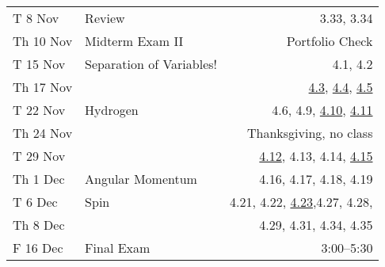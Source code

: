 \documentclass{article}
\begin{document}
\begin{minipage}{\textwidth}
\begin{tabular}{llr}
T 8 Nov & Review & 3.33, 3.34\\
Th 10 Nov &Midterm Exam II & Portfolio Check\\

T 15 Nov & Separation of Variables! &4.1, 4.2 \\
Th 17 Nov & & {\underline{4.3}}, {\underline{4.4}}, {\underline{4.5}} \\

T 22 Nov & Hydrogen & 4.6, 4.9, {\underline{4.10}}, {\underline{4.11}}\\
Th 24 Nov & & Thanksgiving, no class\\

T 29 Nov & &{\underline{4.12}}, 4.13, 4.14, {\underline{4.15}}\\
Th 1 Dec & Angular Momentum & 4.16, 4.17, 4.18, 4.19\\

T 6 Dec & Spin &4.21, 4.22, {\underline{4.23}},4.27, 4.28, \\
Th 8 Dec & & 4.29, 4.31, 4.34, 4.35\\

F 16 Dec& Final Exam & 3:00--5:30
\end{tabular}
\end{minipage}
\end{document}

